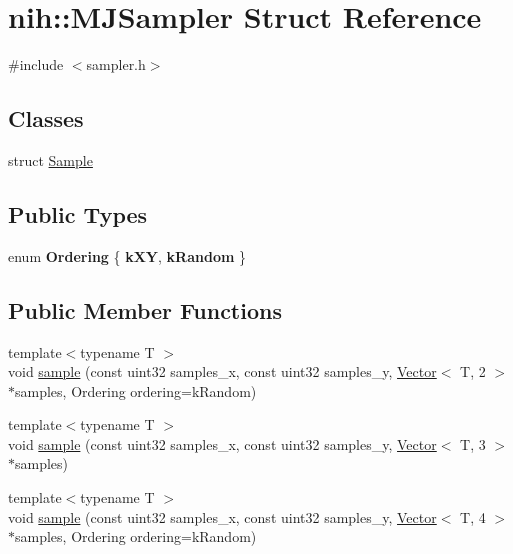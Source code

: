 \hypertarget{structnih_1_1_m_j_sampler}{
\section{nih\-:\-:\-M\-J\-Sampler \-Struct \-Reference}
\label{structnih_1_1_m_j_sampler}
}


{\ttfamily \#include $<$sampler.\-h$>$}

\subsection*{\-Classes}
\begin{DoxyCompactItemize}
\item 
struct \hyperlink{structnih_1_1_m_j_sampler_1_1_sample}{\-Sample}
\end{DoxyCompactItemize}
\subsection*{\-Public \-Types}
\begin{DoxyCompactItemize}
\item 
enum {\bfseries \-Ordering} \{ {\bfseries k\-X\-Y}, 
{\bfseries k\-Random}
 \}
\end{DoxyCompactItemize}
\subsection*{\-Public \-Member \-Functions}
\begin{DoxyCompactItemize}
\item 
{\footnotesize template$<$typename T $>$ }\\void \hyperlink{structnih_1_1_m_j_sampler_a7efa9e4be3bfab3bbeb2c0e1d293f608}{sample} (const uint32 samples\-\_\-x, const uint32 samples\-\_\-y, \hyperlink{structnih_1_1_vector}{\-Vector}$<$ \-T, 2 $>$ $\ast$samples, \-Ordering ordering=k\-Random)
\item 
{\footnotesize template$<$typename T $>$ }\\void \hyperlink{structnih_1_1_m_j_sampler_a162a0c19596eef3f9debe2ee0550c136}{sample} (const uint32 samples\-\_\-x, const uint32 samples\-\_\-y, \hyperlink{structnih_1_1_vector}{\-Vector}$<$ \-T, 3 $>$ $\ast$samples)
\item 
{\footnotesize template$<$typename T $>$ }\\void \hyperlink{structnih_1_1_m_j_sampler_a4c2fc9b264a9f2de35125d51e4e19fe4}{sample} (const uint32 samples\-\_\-x, const uint32 samples\-\_\-y, \hyperlink{structnih_1_1_vector}{\-Vector}$<$ \-T, 4 $>$ $\ast$samples, \-Ordering ordering=k\-Random)
\end{DoxyCompactItemize}

